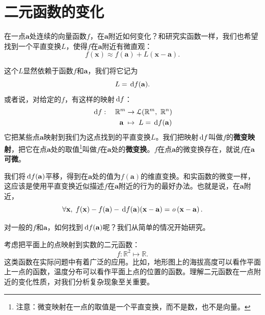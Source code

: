 \documentclass[12pt,UTF8,fontset=none]{ctexbook}
\begin{document}
\section{二元函数的变化}

在一点$\mathbf{a}$处连续的向量函数$f$，在$\mathbf{a}$附近如何变化？和研究实函数一样，我们也希望找到一个平直变换$L$，使得$f$在$\mathbf{a}$附近有微直观：
$$ f(\mathbf{x}) \approx f(\mathbf{a}) + L (\mathbf{x} - \mathbf{a}). $$

这个$L$显然依赖于函数$f$和$\mathbf{a}$，我们将它记为
$$ L = \,\mathrm{d} f (\mathbf{a}). $$
或者说，对给定的$f$，有这样的映射$\,\mathrm{d} f$：
\begin{align*}
    \,\mathrm{d} f:\quad \mathbb{R}^m &\rightarrow \mathcal{L}(\mathbb{R}^m, \,\,\mathbb{R}^n) \\
    \mathbf{a}\; &\mapsto \; L = \,\mathrm{d} f (\mathbf{a})
\end{align*}
它把某些点$\mathbf{a}$映射到我们为这点找到的平直变换$L$。我们把映射$\,\mathrm{d} f$叫做$f$的\textbf{微变映射}，把它在点$\mathbf{a}$处的取值\footnote{注意：微变映射在一点的取值是一个平直变换，而不是数，也不是向量。}叫做$f$在$\mathbf{a}$处的\textbf{微变换}。$f$在点$\mathbf{a}$的微变换存在，就说$f$在$\mathbf{a}$\textbf{可微}。

我们将$\,\mathrm{d} f (\mathbf{a})$平移，得到在$\mathbf{a}$处的值为$f(\mathbf{a})$的维直变换。和实函数的微变一样，这应该是使用平直变换近似描述$f$在$\mathbf{a}$附近的行为的最好办法。也就是说，在$\mathbf{a}$附近，
$$ \forall \mathbf{x}, \; f(\mathbf{x}) - f(\mathbf{a}) - \,\mathrm{d} f (\mathbf{a})(\mathbf{x} - \mathbf{a}) = \mathit{o}\left(\mathbf{x} - \mathbf{a}\right). $$

对一般的$f$和$\mathbf{a}$，如何找到$\,\mathrm{d} f (\mathbf{a})$呢？我们从简单的情况开始研究。

考虑把平面上的点映射到实数的二元函数：
$$ f : \mathbb{R}^2 \mapsto \mathbb{R}.$$
这类函数在实际问题中有着广泛的应用。比如，地形图上的海拔高度可以看作平面上一点的函数，温度分布可以看作平面上点的位置的函数。理解二元函数在一点附近的变化性质，对我们分析复杂现象至关重要。
\end{document}
